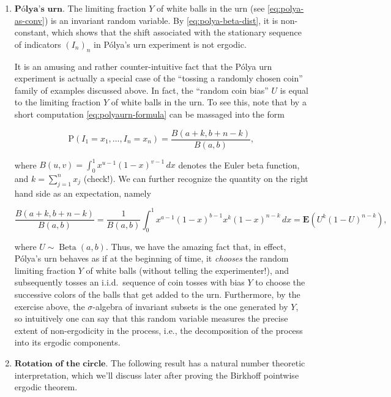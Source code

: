 \documentclass[11pt]{report}
\theoremstyle{plain}
\theoremstyle{definition}
\newtheorem{xexercise}[thm]{Exercise}
\begin{document}
\begin{enumerate}[label=\arabic*.]
\begin{xexercise}
Show that the $\sigma$-algebra $\mathcal{I}$ of
invariant subsets for this process coincides with the
$\sigma$-algebra $\sigma(U)$ generated by the random
coin bias $U$. That means that, not only is $U$ an
invariant random variable, but any other invariant
random variable can be computed once the value of $U$
is known.
\end{xexercise}

\item $\textbf{Pólya's urn.}$ The limiting fraction $Y$ of
white balls in the urn (see \eqref{eq:polya-as-conv}) is
an invariant random variable. By
\eqref{eq:polya-beta-dist}, it is non-constant, which
shows that the shift associated  with the stationary
sequence of indicators $(I_n)_n$ in Pólya's urn
experiment is not ergodic.

It is an amusing and rather counter-intuitive fact
that the Pólya urn experiment is actually a special
case of the ``tossing a randomly chosen coin'' family
of examples discussed above. In fact, the ``random
coin bias'' $U$ is equal to the limiting fraction $Y$
of white balls in the urn. To see this, note that by a
short computation \eqref{eq:polyaurn-formula} can be
massaged into the form

\[
\mathrm{P}(I_1=x_1, \ldots, I_n=x_n) = \frac{B(a+k, b+n-k)}{B(a,b)},
\]

\noindent where $B(u,v)=\int_0^1 x^{u-1}(1-x)^{v-1}\,dx$
denotes the Euler beta function, and
$k=\sum_{j=1}^n x_j$ (check!). We can further
recognize the quantity on the right hand side as an
expectation, namely

\[
\frac{B(a+k, b+n-k)}{B(a,b)}= \frac{1}{B(a,b)}\int_0^1 x^{a-1}(1-x)^{b-1} x^k(1-x)^{n-k}\,dx = \mathbf{E}(U^k(1-U)^{n-k}),
\]

\noindent where $U\sim \operatorname{Beta}(a,b)$. Thus, we have
the amazing fact that, in effect, Pólya's urn behaves
as if at the beginning of time, it \emph{chooses} the
random limiting fraction $Y$ of white balls (without
telling the experimenter!), and subsequently tosses an
i.i.d.\ sequence of coin tosses with bias $Y$ to
choose the successive colors of the balls that get
added to the urn. Furthermore, by the exercise above,
the $\sigma$-algebra of invariant subsets is the one
generated by $Y$, so intuitively one can say that
this random variable measures the precise extent of
non-ergodicity in the process, i.e., the decomposition
of the process into its ergodic components.

\item $\textbf{Rotation of the circle.}$ The following
result has a natural number theoretic interpretation,
which we'll discuss later after proving the Birkhoff
pointwise ergodic theorem.


\end{enumerate}
\end{document}
